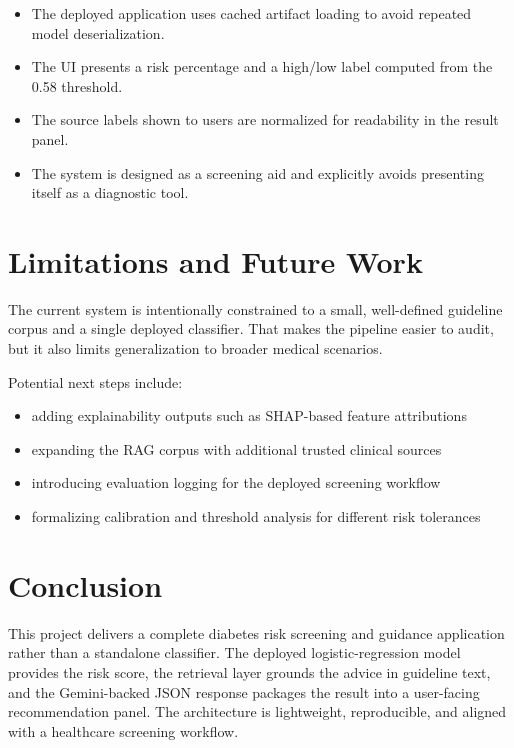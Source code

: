 \documentclass[12pt]{article}
\begin{document}
\begin{itemize}
\item The deployed application uses cached artifact loading to avoid repeated model deserialization.
\item The UI presents a risk percentage and a high/low label computed from the 0.58 threshold.
\item The source labels shown to users are normalized for readability in the result panel.
\item The system is designed as a screening aid and explicitly avoids presenting itself as a diagnostic tool.
\end{itemize}

\section{Limitations and Future Work}

The current system is intentionally constrained to a small, well-defined guideline corpus and a single deployed classifier. That makes the pipeline easier to audit, but it also limits generalization to broader medical scenarios.

Potential next steps include:

\begin{itemize}
\item adding explainability outputs such as SHAP-based feature attributions
\item expanding the RAG corpus with additional trusted clinical sources
\item introducing evaluation logging for the deployed screening workflow
\item formalizing calibration and threshold analysis for different risk tolerances
\end{itemize}

\section{Conclusion}

This project delivers a complete diabetes risk screening and guidance application rather than a standalone classifier. The deployed logistic-regression model provides the risk score, the retrieval layer grounds the advice in guideline text, and the Gemini-backed JSON response packages the result into a user-facing recommendation panel. The architecture is lightweight, reproducible, and aligned with a healthcare screening workflow.
\end{document}
